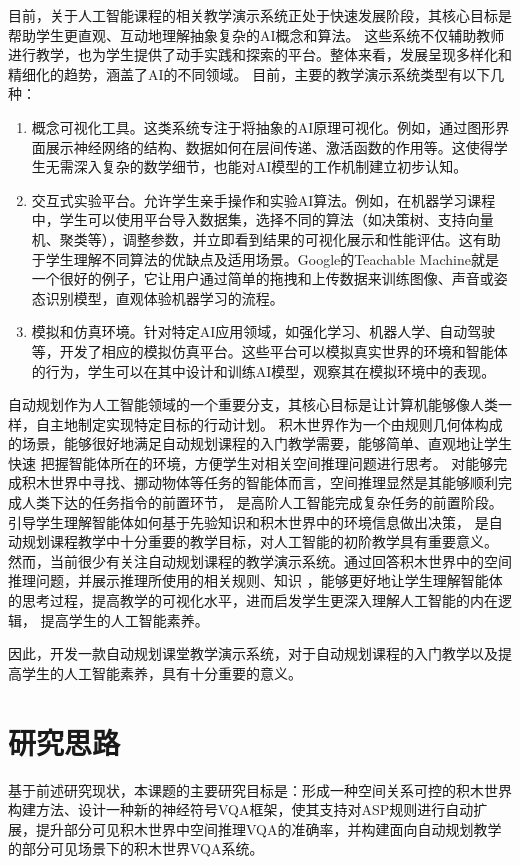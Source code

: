 目前，关于人工智能课程的相关教学演示系统正处于快速发展阶段，其核心目标是帮助学生更直观、互动地理解抽象复杂的AI概念和算法。
这些系统不仅辅助教师进行教学，也为学生提供了动手实践和探索的平台。整体来看，发展呈现多样化和精细化的趋势，涵盖了AI的不同领域。
目前，主要的教学演示系统类型有以下几种：
\begin{enumerate}[nosep]
\item 概念可视化工具。这类系统专注于将抽象的AI原理可视化。例如，通过图形界面展示神经网络的结构、数据如何在层间传递、激活函数的作用等。这使得学生无需深入复杂的数学细节，也能对AI模型的工作机制建立初步认知。
\item 交互式实验平台。允许学生亲手操作和实验AI算法。例如，在机器学习课程中，学生可以使用平台导入数据集，选择不同的算法（如决策树、支持向量机、聚类等），调整参数，并立即看到结果的可视化展示和性能评估。这有助于学生理解不同算法的优缺点及适用场景。Google的Teachable Machine就是一个很好的例子，它让用户通过简单的拖拽和上传数据来训练图像、声音或姿态识别模型，直观体验机器学习的流程。
\item 模拟和仿真环境。针对特定AI应用领域，如强化学习、机器人学、自动驾驶等，开发了相应的模拟仿真平台。这些平台可以模拟真实世界的环境和智能体的行为，学生可以在其中设计和训练AI模型，观察其在模拟环境中的表现。
\end{enumerate}

自动规划作为人工智能领域的一个重要分支，其核心目标是让计算机能够像人类一样，自主地制定实现特定目标的行动计划。
积木世界作为一个由规则几何体构成的场景，能够很好地满足自动规划课程的入门教学需要，能够简单、直观地让学生快速
把握智能体所在的环境，方便学生对相关空间推理问题进行思考。
对能够完成积木世界中寻找、挪动物体等任务的智能体而言，空间推理显然是其能够顺利完成人类下达的任务指令的前置环节，
是高阶人工智能完成复杂任务的前置阶段。引导学生理解智能体如何基于先验知识和积木世界中的环境信息做出决策，
是自动规划课程教学中十分重要的教学目标，对人工智能的初阶教学具有重要意义。
然而，当前很少有关注自动规划课程的教学演示系统。通过回答积木世界中的空间推理问题，并展示推理所使用的相关规则、知识
，能够更好地让学生理解智能体的思考过程，提高教学的可视化水平，进而启发学生更深入理解人工智能的内在逻辑，
提高学生的人工智能素养。

因此，开发一款自动规划课堂教学演示系统，对于自动规划课程的入门教学以及提高学生的人工智能素养，具有十分重要的意义。
\section{研究思路}
基于前述研究现状，本课题的主要研究目标是：形成一种空间关系可控的积木世界构建方法、设计一种新的神经符号VQA框架，使其支持对ASP规则进行自动扩展，提升部分可见积木世界中空间推理VQA的准确率，并构建面向自动规划教学的部分可见场景下的积木世界VQA系统。

